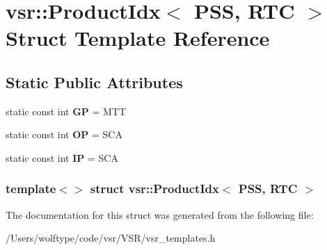 \hypertarget{structvsr_1_1_product_idx_3_01_p_s_s_00_01_r_t_c_01_4}{\section{vsr\-:\-:Product\-Idx$<$ P\-S\-S, R\-T\-C $>$ Struct Template Reference}
\label{structvsr_1_1_product_idx_3_01_p_s_s_00_01_r_t_c_01_4}
}
\subsection*{Static Public Attributes}
\begin{DoxyCompactItemize}
\item 
\hypertarget{structvsr_1_1_product_idx_3_01_p_s_s_00_01_r_t_c_01_4_aff1ebcc983ed1b2e5136276fb52f14e1}{static const int {\bfseries G\-P} = M\-T\-T}\label{structvsr_1_1_product_idx_3_01_p_s_s_00_01_r_t_c_01_4_aff1ebcc983ed1b2e5136276fb52f14e1}

\item 
\hypertarget{structvsr_1_1_product_idx_3_01_p_s_s_00_01_r_t_c_01_4_a769af7b69f0843af663d90e369987121}{static const int {\bfseries O\-P} = S\-C\-A}\label{structvsr_1_1_product_idx_3_01_p_s_s_00_01_r_t_c_01_4_a769af7b69f0843af663d90e369987121}

\item 
\hypertarget{structvsr_1_1_product_idx_3_01_p_s_s_00_01_r_t_c_01_4_ad97ca9f2ba2f0f7978adc9c9767c1d58}{static const int {\bfseries I\-P} = S\-C\-A}\label{structvsr_1_1_product_idx_3_01_p_s_s_00_01_r_t_c_01_4_ad97ca9f2ba2f0f7978adc9c9767c1d58}

\end{DoxyCompactItemize}
\subsubsection*{template$<$$>$ struct vsr\-::\-Product\-Idx$<$ P\-S\-S, R\-T\-C $>$}



The documentation for this struct was generated from the following file\-:\begin{DoxyCompactItemize}
\item 
/\-Users/wolftype/code/vsr/\-V\-S\-R/vsr\-\_\-templates.\-h\end{DoxyCompactItemize}
